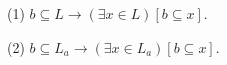 (1) $b \subseteq L \rightarrow (\exists x \in L)[b \subseteq x]$.

(2) $b \subseteq L_a \rightarrow (\exists x \in L_a)[b \subseteq x]$.
